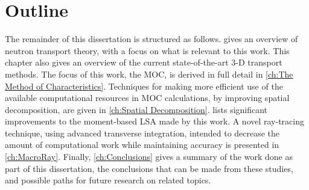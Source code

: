 {  \section{Outline}{\label{sec:Introduction:Outline}
    The remainder of this dissertation is structured as follows.
     gives an overview of neutron transport theory, with a focus on what is relevant to this work.
    This chapter also gives an overview of the current state-of-the-art 3-D transport methods.
    The focus of this work, the \ac{MOC}, is derived in full detail in \cref{ch:The Method of Characteristics}.
    Techniques for making more efficient use of the available computational resources in \ac{MOC} calculations, by improving spatial decomposition, are given in \cref{ch:Spatial Decomposition}.
     lists significant improvements to the moment-based \acf{LSA} made by this work.
    A novel ray-tracing technique, using advanced transverse integration, intended to decrease the amount of computational work while maintaining accuracy is presented in \cref{ch:MacroRay}.
    Finally, \cref{ch:Conclusions} gives a summary of the work done as part of this dissertation, the conclusions that can be made from these studies, and possible paths for future research on related topics.
  }
  \printbibliography
}
